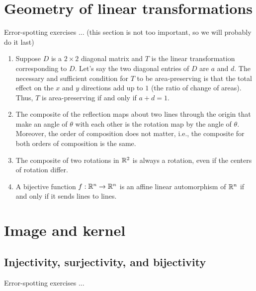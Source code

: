 \documentclass[10pt]{amsart}
\begin{document}
\section{Geometry of linear transformations}

Error-spotting exercises ... (this section is not too important, so we
will probably do it last)

\begin{enumerate}
\item Suppose $D$ is a $2 \times 2$ diagonal matrix and $T$ is the
  linear transformation corresponding to $D$. Let's say the two
  diagonal entries of $D$ are $a$ and $d$. The necessary and
  sufficient condition for $T$ to be area-preserving is that the total
  effect on the $x$ and $y$ directions add up to $1$ (the ratio of
  change of areas). Thus, $T$ is area-preserving if and only if $a + d = 1$.
\item The composite of the reflection maps about two lines through the
  origin that make an angle of $\theta$ with each other is the
  rotation map by the angle of $\theta$. Moreover, the order of
  composition does not matter, i.e., the composite for both orders of
  composition is the same.
\item The composite of two rotations in $\mathbb{R}^2$ is always a rotation,
  even if the centers of rotation differ.
\item A bijective function $f:\mathbb{R}^n \to \mathbb{R}^n$ is an affine linear
  automorphism of $\mathbb{R}^n$ if and only if it sends lines to lines.
\end{enumerate}

\section{Image and kernel}

\subsection{Injectivity, surjectivity, and bijectivity}

Error-spotting exercises ...
\end{document}
